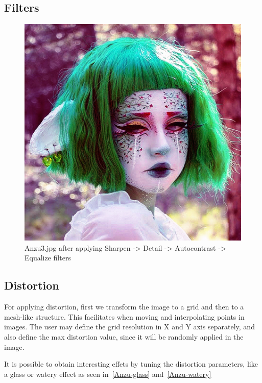 \documentclass[12pt,a4paper]{article}
\begin{document}
\subsection{Filters}

    \begin{figure}[!ht]
        \centering
        \includegraphics[scale=0.5]{Anzu-test.jpg}
        \caption{Anzu3.jpg after applying Sharpen -> Detail -> Autocontrast -> Equalize filters}
        \label{Anzu-test}
    \end{figure}

\subsection{Distortion}
    For applying distortion, first we transform the image to a grid and then to a mesh-like structure. This facilitates when moving and interpolating points in images. The user may define the grid resolution in X and Y axis separately, and also define the max distortion value, since it will be randomly applied in the image.

    It is possible to obtain interesting effets by tuning the distortion parameters, like a glass or watery effect as seen in~\ref{Anzu-glass} and~\ref{Anzu-watery}
\end{document}
